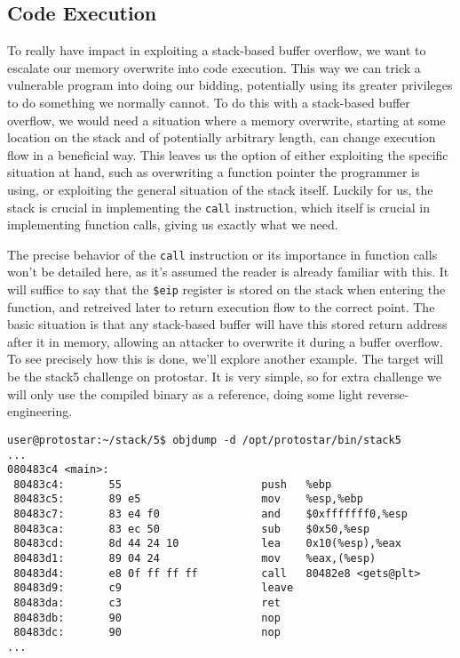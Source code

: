 \subsection{Code Execution}

To really have impact in exploiting a stack-based buffer overflow, we want to escalate our
memory overwrite into code execution. This way we can trick a vulnerable program into
doing our bidding, potentially using its greater privileges to do something we normally cannot.
To do this with a stack-based buffer overflow, we would need a situation where a memory overwrite, 
starting at some location on the stack and of potentially arbitrary length, can change execution
flow in a beneficial way. This leaves us the option of either exploiting the specific situation
at hand, such as overwriting a function pointer the programmer is using, or exploiting the general
situation of the stack itself. Luckily for us, the stack is crucial in implementing the \texttt{call}
instruction, which itself is crucial in implementing function calls, giving us exactly what we need.

The precise behavior of the \texttt{call} instruction or its importance in function calls won't be detailed
here, as it's assumed the reader is already familiar with this. It will suffice to say that the \texttt{\$eip}
register is stored on the stack when entering the function, and retreived later to return execution
flow to the correct point. The basic situation is that any stack-based buffer will have this stored return
address after it in memory, allowing an attacker to overwrite it during a buffer overflow. To see precisely
how this is done, we'll explore another example. The target will be the stack5 challenge on protostar.
It is very simple, so for extra challenge
we will only use the compiled binary as a reference, doing some light reverse-engineering.

\begin{lstlisting}
user@protostar:~/stack/5$ objdump -d /opt/protostar/bin/stack5
...
080483c4 <main>:
 80483c4:       55                      push   %ebp
 80483c5:       89 e5                   mov    %esp,%ebp
 80483c7:       83 e4 f0                and    $0xfffffff0,%esp
 80483ca:       83 ec 50                sub    $0x50,%esp
 80483cd:       8d 44 24 10             lea    0x10(%esp),%eax
 80483d1:       89 04 24                mov    %eax,(%esp)
 80483d4:       e8 0f ff ff ff          call   80482e8 <gets@plt>
 80483d9:       c9                      leave  
 80483da:       c3                      ret    
 80483db:       90                      nop
 80483dc:       90                      nop
...
\end{lstlisting}

